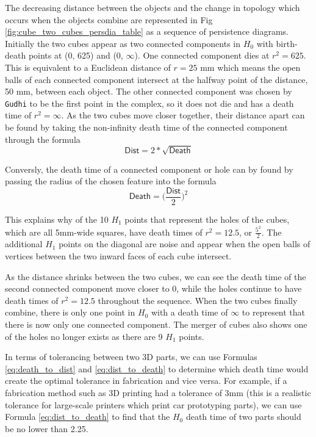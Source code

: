 \documentclass[ma]{uncgdissertationexp}
\theoremstyle{plain}
\theoremstyle{definition}
\theoremstyle{remark}
\begin{document}
\par The decreasing distance between the objects and the change in topology which occurs when the objects combine are represented in Fig \ref{fig:cube_two_cubes_persdia_table} as a sequence of persistence diagrams. Initially the two cubes appear as two connected components in $H_{0}$ with birth-death points at (0, 625) and (0, $\infty$). One connected component dies at $r^{2} = 625$. This is equivalent to a Euclidean distance of $r=25$ mm which means the open balls of each connected component intersect at the halfway point of the distance, 50 mm, between each object. The other connected component was chosen by \verb"Gudhi" to be the first point in the complex, so it does not die and has a death time of $r^2=\infty$. As the two cubes move closer together, their distance apart can be found by taking the non-infinity death time of the connected component through the formula 
\begin{equation}\label{eq:death_to_dist}
\mathsf{Dist} = 2*\sqrt{\mathsf{Death}}
\end{equation}
\par Conversly, the death time of a connected component or hole can by found by passing the radius of the chosen feature into the formula 
\begin{equation}\label{eq:dist_to_death}
\mathsf{Death} = \big(\frac{\mathsf{Dist}}{2}\big)^{2}
\end{equation}
\par This explains why of the 10 $H_{1}$ points that represent the holes of the cubes, which are all 5mm-wide squares, have death times of $r^{2}=12.5$, or $\frac{5^{2}}{2}$. The additional $H_{1}$ points on the diagonal are noise and appear when the open balls of vertices between the two inward faces of each cube intersect.
\par As the distance shrinks between the two cubes, we can see the death time of the second connected component move closer to 0, while the holes continue to have death times of $r^{2} = 12.5$ throughout the sequence. When the two cubes finally combine, there is only one point in $H_{0}$ with a death time of $\infty$ to represent that there is now only one connected component. The merger of cubes also shows one of the holes no longer exists as there are 9 $H_{1}$ points.
\par In terms of tolerancing between two 3D parts, we can use Formulas \ref{eq:death_to_dist} and \ref{eq:dist_to_death} to determine which death time would create the optimal tolerance in fabrication and vice versa. For example, if a fabrication method such as 3D printing had a tolerance of 3mm (this is a realistic tolerance for large-scale printers which print car prototyping parts), we can use Formula \ref{eq:dist_to_death} to find that the $H_{0}$ death time of two parts should be no lower than 2.25.
\newpage
\end{document}
